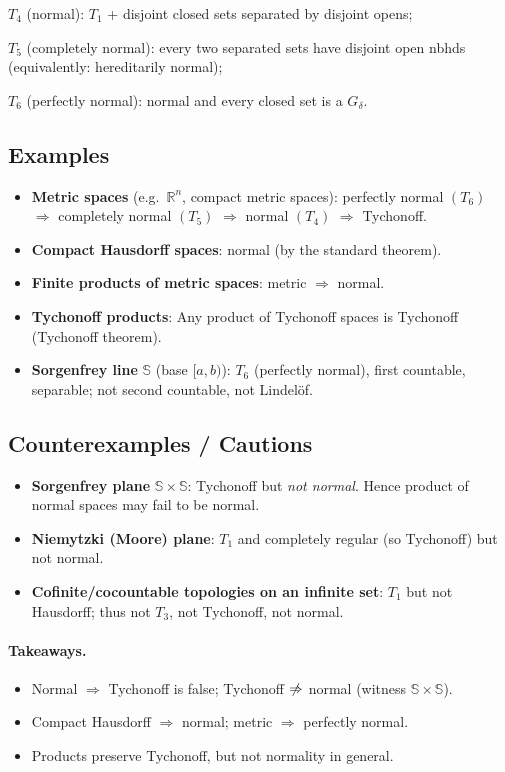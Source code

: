 \documentclass[12pt,a4paper]{article}
\theoremstyle{plain}
\theoremstyle{definition}
\theoremstyle{remark}
\theoremstyle{remark}
\begin{document}
	$T_4$ (normal): $T_1$ + disjoint closed sets separated by disjoint opens;
	
	$T_5$ (completely normal): every two separated sets have disjoint open nbhds (equivalently: hereditarily normal);
	
	$T_6$ (perfectly normal): normal and every closed set is a $G_\delta$.
	
	\subsection*{Examples}
	\begin{itemize}
		\item \textbf{Metric spaces} (e.g.\ $\mathbb{R}^n$, compact metric spaces): perfectly normal $(T_6)$ $\Rightarrow$ completely normal $(T_5)$ $\Rightarrow$ normal $(T_4)$ $\Rightarrow$ Tychonoff.
		\item \textbf{Compact Hausdorff spaces}: normal (by the standard theorem).
		\item \textbf{Finite products of metric spaces}: metric $\Rightarrow$ normal.
		\item \textbf{Tychonoff products}: Any product of Tychonoff spaces is Tychonoff (Tychonoff theorem).
		\item \textbf{Sorgenfrey line} $\mathbb{S}$ (base $[a,b)$): $T_6$ (perfectly normal), first countable, separable; not second countable, not Lindelöf.
	\end{itemize}
	
	\subsection*{Counterexamples / Cautions}
	\begin{itemize}
		\item \textbf{Sorgenfrey plane} $\mathbb{S}\times\mathbb{S}$: Tychonoff but \emph{not normal}. Hence product of normal spaces may fail to be normal.
		\item \textbf{Niemytzki (Moore) plane}: $T_1$ and completely regular (so Tychonoff) but not normal.
		\item \textbf{Cofinite/cocountable topologies on an infinite set}: $T_1$ but not Hausdorff; thus not $T_3$, not Tychonoff, not normal.
	\end{itemize}
	
	\paragraph{Takeaways.}
	\begin{itemize}
		\item Normal $\Rightarrow$ Tychonoff is false; Tychonoff $\centernot\Rightarrow$ normal (witness $\mathbb{S}\times\mathbb{S}$).
		\item Compact Hausdorff $\Rightarrow$ normal; metric $\Rightarrow$ perfectly normal.
		\item Products preserve Tychonoff, but not normality in general.
	\end{itemize}
	
\end{document}
